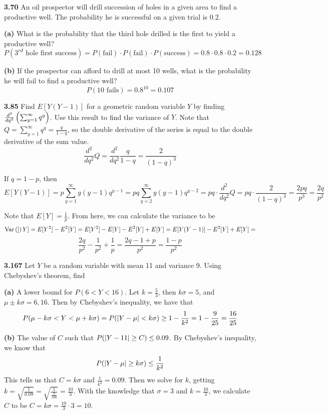 \documentclass{exam}
\begin{document}
\begin{questions}
\newpage
\textbf{3.70 } An oil prospector will drill succession of holes in a given area to find a productive well. The probability he is successful on a given trial is 0.2.

\textbf{(a) } What is the probability that the third hole drilled is the first to yield a productive well?
\sol
$$P(\text{$3^{rd}$ hole first success}) = P(\text{fail}) \cdot P(\text{fail}) \cdot P(\text{success}) = 0.8 \cdot 0.8 \cdot 0.2 = 0.128$$


\textbf{(b) } If the prospector can afford to drill at most 10 wells, what is the probability he will fail to find a productive well?
\sol
$$P(\text{10 fails}) = 0.8^{10} = 0.107$$


\newpage
\textbf{3.85 } Find $E[Y(Y - 1)]$ for a geometric random variable $Y$ by finding $\frac{d^2}{dq^2}\left( \sum_{y = 1}^\infty q^y \right)$. Use this result to find the variance of $Y$.
\sol
Note that $Q = \sum_{y = 1}^\infty q^y = \frac{q}{1 - q}$, so the double derivative of the series is equal to the double derivative of the sum value.
$$\frac{d^2}{dq^2} Q = \frac{d^2}{dq^2}\frac{q}{1 - q} = \frac{2}{(1 - q)^3}$$

If $q = 1 - p$, then
$$E[Y(Y - 1)] = p\sum_{y = 1}^\infty y(y - 1) q^{y - 1} = pq\sum_{y = 2}^\infty y(y - 1) q^{y - 2} = pq \cdot \frac{d^2}{dq^2} Q = pq \cdot \frac{2}{(1 - q)^3} = \frac{2pq}{p^3} = \frac{2q}{p^2}$$

Note that $E[Y] = \frac{1}{p}$. From here, we can calculate the variance to be
$$\text{Var}\left( [ \right)Y] = E[Y^2] - E^2[Y] = E[Y^2] - E[Y] - E^2[Y] + E[Y] = E[Y(Y - 1)] - E^2[Y] + E[Y] =$$
$$\frac{2q}{p^2} - \frac{1}{p^2} + \frac{1}{p} = \frac{2q - 1 + p}{p^2} = \frac{1 - p}{p^2}$$



\newpage
\textbf{3.167 } Let $Y$ be a random variable with mean 11 and variance 9. Using Chebyshev's theorem, find

\newline

\textbf{(a) } A lower bound for $P(6 < Y < 16)$.
\sol
Let $k = \frac{5}{3}$, then $k\sigma = 5$, and $\mu \pm k\sigma = 6, 16$. Then by Chebyshev's inequality, we have that 
$$P(\mu - k\sigma < Y < \mu + k\sigma) = P(\left| Y - \mu \right| < k\sigma) \geq 1 - \frac{1}{k^2} = 1 - \frac{9}{25} = \frac{16}{25}$$

\textbf{(b) } The value of $C$ such that $P(\left| Y - 11 \right| \geq C) \leq 0.09$.
\sol
By Chebyshev's inequality, we know that 
$$P(\left| Y - \mu \right| \geq k\sigma) \leq \frac{1}{k^2}$$
This tells us that $C = k\sigma$ and $\frac{1}{k^2} = 0.09$. Then we solve for $k$, getting $k = \sqrt{\frac{1}{0.09}} = \sqrt{\frac{1}{\frac{9}{100}}} = \frac{10}{3}$. With the knowledge that $\sigma = 3$ and $k = \frac{10}{3}$, we calculate $C$ to be $C = k\sigma = \frac{10}{3} \cdot 3 = 10$.


\end{questions}
\end{document}
